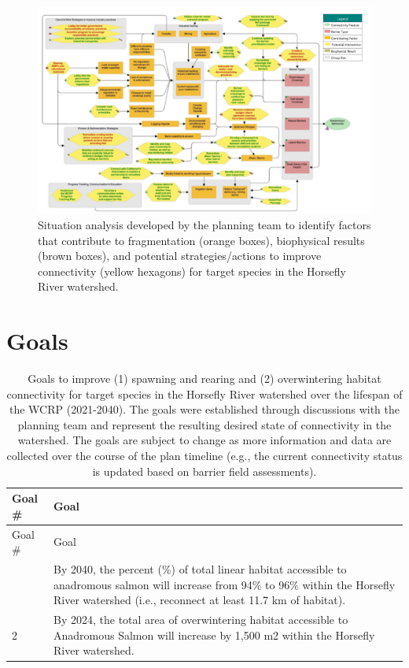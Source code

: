 \documentclass[
  letterpaper,
  DIV=11,
  numbers=noendperiod]{scrreprt}
\begin{document}
\begin{figure}

{\centering \includegraphics{images/figure3.png}

}

\caption{\label{fig-sitan}Situation analysis developed by the planning
team to identify factors that contribute to fragmentation (orange
boxes), biophysical results (brown boxes), and potential
strategies/actions to improve connectivity (yellow hexagons) for target
species in the Horsefly River watershed.}

\end{figure}

\hypertarget{goals}{%
\section*{Goals}\label{goals}}


\hypertarget{tbl-goals}{}
\begin{longtable}[]{@{}ll@{}}
\caption{\label{tbl-goals}Goals to improve (1) spawning and rearing and
(2) overwintering habitat connectivity for target species in the
Horsefly River watershed over the lifespan of the WCRP (2021-2040). The
goals were established through discussions with the planning team and
represent the resulting desired state of connectivity in the watershed.
The goals are subject to change as more information and data are
collected over the course of the plan timeline (e.g., the current
connectivity status is updated based on barrier field
assessments).}\label{T_d4dd6_}\tabularnewline
\toprule\noalign{}
Goal \# & Goal \\
\midrule\noalign{}
\endfirsthead
\toprule\noalign{}
Goal \# & Goal \\
\midrule\noalign{}
\endhead
\bottomrule\noalign{}
\endlastfoot
1 & By 2040, the percent (\%) of total linear habitat accessible to
anadromous salmon will increase from 94\% to 96\% within the Horsefly
River watershed (i.e., reconnect at least 11.7 km of habitat). \\
2 & By 2024, the total area of overwintering habitat accessible to
Anadromous Salmon will increase by 1,500 m2 within the Horsefly River
watershed. \\
\end{longtable}
\end{document}
